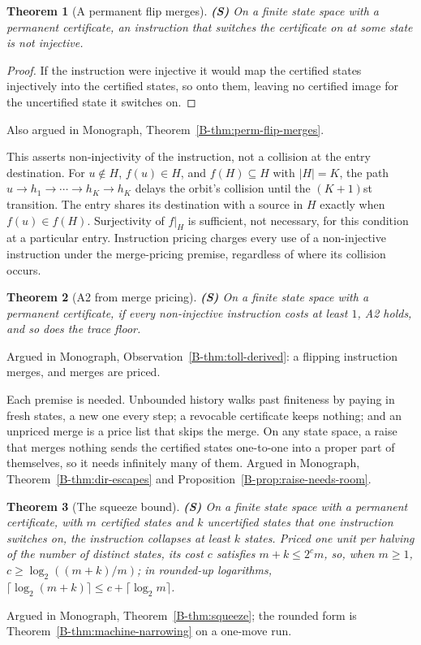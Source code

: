 \documentclass[11pt, a4paper]{report}
\theoremstyle{definition}
\theoremstyle{plain}
\newtheorem{theorem}{Theorem}[chapter]
\begin{document}
\begin{theorem}[A permanent flip merges] \textbf{(S)}
On a finite state space with a permanent certificate, an instruction that switches the certificate on at some state is not injective.
\end{theorem}

\begin{proof}
If the instruction were injective it would map the certified states injectively into the certified states, so onto them, leaving no certified image for the uncertified state it switches on.
\end{proof}
\noindent Also argued in Monograph, Theorem~\ref{B-thm:perm-flip-merges}.

This asserts non-injectivity of the instruction, not a collision at the entry
destination. For $u\notin H$, $f(u)\in H$, and $f(H)\subseteq H$ with $|H|=K$,
the path $u\to h_1\to\cdots\to h_K\to h_K$ delays the orbit's collision until
the $(K+1)$st transition. The entry shares its destination with a source in $H$
exactly when $f(u)\in f(H)$. Surjectivity of $f|_H$ is sufficient, not necessary,
for this condition at a particular entry. Instruction pricing charges every use
of a non-injective instruction under the merge-pricing premise, regardless of
where its collision occurs.

\begin{theorem}[A2 from merge pricing] \textbf{(S)}
On a finite state space with a permanent certificate, if every non-injective instruction costs at least $1$, A2 holds, and so does the trace floor.
\end{theorem}
\noindent Argued in Monograph, Observation~\ref{B-thm:toll-derived}: a flipping instruction merges, and merges are priced.

Each premise is needed. Unbounded history walks past finiteness by paying in fresh states, a new one every step; a revocable certificate keeps nothing; and an unpriced merge is a price list that skips the merge. On any state space, a raise that merges nothing sends the certified states one-to-one into a proper part of themselves, so it needs infinitely many of them. Argued in Monograph, Theorem~\ref{B-thm:dir-escapes} and Proposition~\ref{B-prop:raise-needs-room}.

\begin{theorem}[The squeeze bound] \textbf{(S)}
On a finite state space with a permanent certificate, with $m$ certified states and $k$ uncertified states that one instruction switches on, the instruction collapses at least $k$ states. Priced one unit per halving of the number of distinct states, its cost $c$ satisfies $m + k \le 2^c m$, so, when $m \ge 1$, $c \ge \log_2((m+k)/m)$; in rounded-up logarithms, $\lceil\log_2(m+k)\rceil \le c + \lceil\log_2 m\rceil$.
\end{theorem}
\noindent Argued in Monograph, Theorem~\ref{B-thm:squeeze}; the rounded form is
Theorem~\ref{B-thm:machine-narrowing} on a one-move run.
\end{document}
